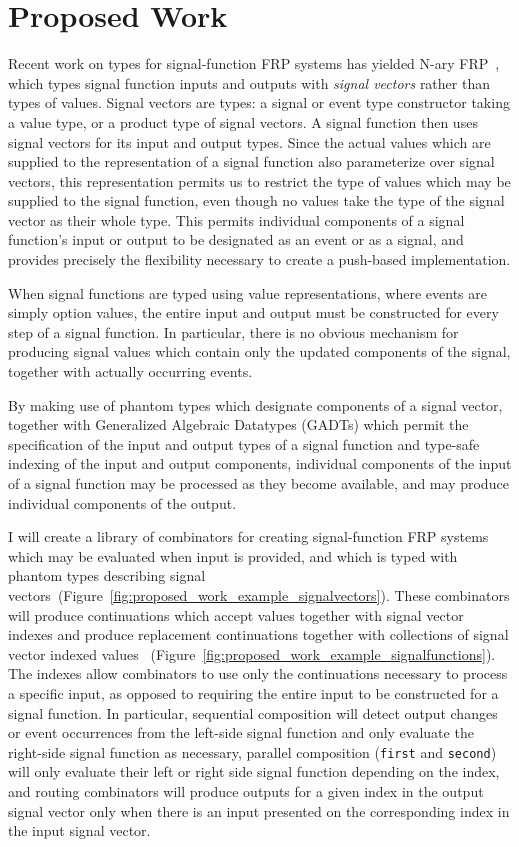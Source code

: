 \section{Proposed Work}
\label{section:ProposedWork}

Recent work on types for signal-function FRP systems has yielded N-ary FRP~\cite{Sculthorpe2011}, which types signal function inputs and outputs
with {\em signal vectors} rather than types of values. Signal vectors are types: a signal or event type constructor taking a value type,
or a product type of signal vectors. A signal function then uses signal vectors for its input and output types. Since the actual values which are supplied to the
representation of a signal function also parameterize over signal vectors, this representation permits us to restrict the type of values which may be supplied to the signal
function, even though no values take the type of the signal vector as their whole type. This permits individual components of a signal function's input or output to be
designated as an event or as a signal, and provides precisely the flexibility necessary to create a push-based implementation.

When signal functions are typed using value representations, where events are simply option values, the entire input and output must be constructed
for every step of a signal function. In particular, there is no obvious mechanism for producing signal values which contain only the updated components
of the signal, together with actually occurring events. 

By making use of phantom types which designate components of a signal vector, together with Generalized Algebraic Datatypes (GADTs) which
permit the specification of the input and output types of a signal function and type-safe indexing of the input and output components,
individual components of the input of a signal function may be processed as they become available, and may produce individual components of
the output.

I will create a library of combinators for creating signal-function FRP systems which may be evaluated when input is provided, and which
is typed with phantom types describing signal vectors~(Figure~\ref{fig:proposed_work_example_signalvectors}). These combinators will produce continuations
which accept values together with signal vector indexes and produce replacement continuations together with collections of signal vector indexed values
~(Figure~\ref{fig:proposed_work_example_signalfunctions}). 
The indexes allow combinators to use only the continuations necessary to process a specific input, as opposed to requiring the entire input
to be constructed for a signal function. In particular, sequential composition will detect output changes or event
occurrences from the left-side signal function and only evaluate the right-side signal function as necessary, parallel composition ({\tt first} and {\tt second})
will only evaluate their left or right side signal function depending on the index, and routing combinators will produce outputs for a given index
in the output signal vector only when there is an input presented on the corresponding index in the input signal vector. 

